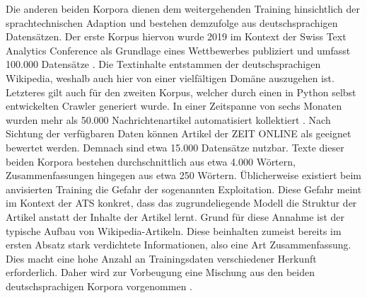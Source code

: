 \noindent
Die anderen beiden Korpora dienen dem weitergehenden Training hinsichtlich der sprachtechnischen Adaption und bestehen demzufolge aus deutschsprachigen Datensätzen. Der erste Korpus hiervon wurde 2019 im Kontext der Swiss Text Analytics Conference als Grundlage eines Wettbewerbes publiziert und umfasst 100.000 Datensätze \cite{CIE19}. Die Textinhalte entstammen der deutschsprachigen Wikipedia, weshalb auch hier von einer vielfältigen Domäne auszugehen ist. Letzteres gilt auch für den zweiten Korpus, welcher durch einen in Python selbst entwickelten Crawler generiert wurde. In einer Zeitspanne von sechs Monaten wurden mehr als 50.000 Nachrichtenartikel automatisiert kollektiert \cite[S.~79,~83,~416]{BIR09}. Nach Sichtung der verfügbaren Daten können Artikel der ZEIT ONLINE als geeignet bewertet werden. Demnach sind etwa 15.000 Datensätze nutzbar. Texte dieser beiden Korpora bestehen durchschnittlich aus etwa 4.000 Wörtern, Zusammenfassungen hingegen aus etwa 250 Wörtern. Üblicherweise existiert beim anvisierten Training die Gefahr der sogenannten Exploitation. Diese Gefahr meint im Kontext der \ac{ATS} konkret, dass das zugrundeliegende Modell die Struktur der Artikel anstatt der Inhalte der Artikel lernt. Grund für diese Annahme ist der typische Aufbau von Wikipedia-Artikeln. Diese beinhalten zumeist bereits im ersten Absatz stark verdichtete Informationen, also eine Art Zusammenfassung. Dies macht eine hohe Anzahl an Trainingsdaten verschiedener Herkunft erforderlich. Daher wird zur Vorbeugung eine Mischung aus den beiden deutschsprachigen Korpora vorgenommen \cite[S.~42]{BIR09}.\\
